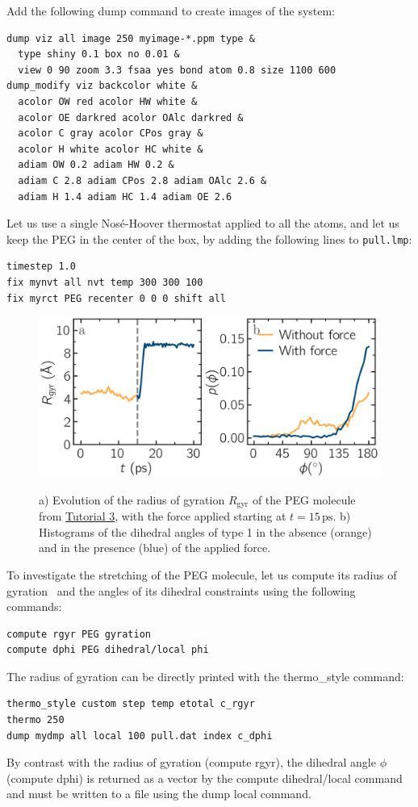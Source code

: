 \documentclass[9pt,tutorial]{livecoms}
\newcommand{\lmpcmd}[1]{\colorbox{listing}{\textcolor{command}{\small{#1}}}} %
\newcommand{\flecmd}[1]{\textcolor{command}{\texttt{#1}}} %
\begin{document}
Add the following \lmpcmd{dump} command to create images of the system:
\begin{lstlisting}
dump viz all image 250 myimage-*.ppm type &
  type shiny 0.1 box no 0.01 &
  view 0 90 zoom 3.3 fsaa yes bond atom 0.8 size 1100 600
dump_modify viz backcolor white &
  acolor OW red acolor HW white &
  acolor OE darkred acolor OAlc darkred &
  acolor C gray acolor CPos gray &
  acolor H white acolor HC white &
  adiam OW 0.2 adiam HW 0.2 &
  adiam C 2.8 adiam CPos 2.8 adiam OAlc 2.6 &
  adiam H 1.4 adiam HC 1.4 adiam OE 2.6
\end{lstlisting}
Let us use a single Nosé-Hoover thermostat applied to all the atoms,
and let us keep the PEG in the center of the box, by adding
the following lines to \flecmd{pull.lmp}:
\begin{lstlisting}
timestep 1.0
fix mynvt all nvt temp 300 300 100
fix myrct PEG recenter 0 0 0 shift all
\end{lstlisting}

\begin{figure}
\centering
\includegraphics[width=\linewidth]{PEG-distance}\\[-2ex]
\caption{a) Evolution of
the radius of gyration $R_\text{gyr}$ of the PEG molecule
from \hyperref[all-atom-label]{Tutorial 3}, with the force
applied starting at $t = 15\,\text{ps}$.  b) Histograms of the dihedral angles of type 1
in the absence (orange) and in the presence (blue) of the applied force.}
\label{fig:PEG-distance}
\end{figure}

To investigate the stretching of the PEG molecule, let us compute its radius of
gyration~\cite{fixmanRadiusGyrationPolymer1962a} and the angles of its dihedral
constraints using the following commands:
\begin{lstlisting}
compute rgyr PEG gyration
compute dphi PEG dihedral/local phi
\end{lstlisting}
The radius of gyration can be directly printed with the \lmpcmd{thermo\_style} command:
\begin{lstlisting}
thermo_style custom step temp etotal c_rgyr
thermo 250
dump mydmp all local 100 pull.dat index c_dphi
\end{lstlisting}
By contrast with the radius of gyration (compute \lmpcmd{rgyr}), the dihedral angle
$\phi$ (compute \lmpcmd{dphi}) is returned as a vector by the \lmpcmd{compute dihedral/local}
command and must be written to a file using the \lmpcmd{dump local} command.
\end{document}
